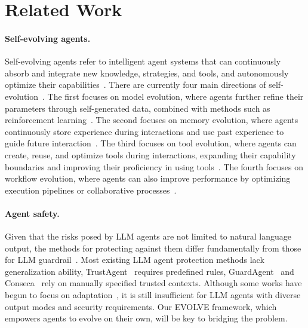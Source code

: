 \section{Related Work}
\label{appendix:relatedwork}
\paragraph{Self-evolving agents.}
Self-evolving agents refer to intelligent agent systems that can continuously absorb and integrate new knowledge, strategies, and tools, and autonomously optimize their capabilities~\citep{fang2025comprehensivesurveyselfevolvingai,gao2025evovlesurvey}. There are currently four main directions of self-evolution~\citep{shao2025misevovle}. The first focuses on model evolution, where agents further refine their parameters through self-generated data, combined with methods such as reinforcement learning~\citep{huang2025rzero,zhou2025safeagent,sun2025seagent}. The second focuses on memory evolution, where agents continuously store experience during interactions and use past experience to guide future interaction~\citep{zhou2025selfchallenging,zhang2025agentexperience,bo2025agentic}. The third focuses on tool evolution, where agents can create, reuse, and optimize tools during interactions, expanding their capability boundaries and improving their proficiency in using tools~\citep{shi2025tool,qu2024exploration}. The fourth focuses on workflow evolution, where agents can also improve performance by optimizing execution pipelines or collaborative processes~\citep{zhang2024aflow,wang2025evoagentx}.
\paragraph{Agent safety.}
Given that the risks posed by LLM agents are not limited to natural language output, the methods for protecting against them differ fundamentally from those for LLM guardrail~\citep{gao2025evovlesurvey,yu2025survey}. Most existing LLM agent protection methods lack generalization ability, TrustAgent~\citep{hua2024trustagent} requires predefined rules, GuardAgent~\citep{xiang2024guardagent} and Conseca~\citep{tsai2025contextual} rely on manually specified trusted contexts. Although some works have begun to focus on adaptation~\citep{zhou2025safeagent,luo2025agrail}, it is still insufficient for LLM agents with diverse output modes and security requirements. Our EVOLVE framework, which empowers agents to evolve on their own, will be key to bridging the problem.